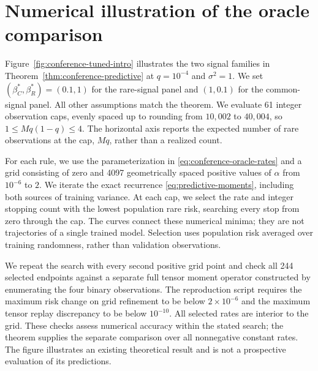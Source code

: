 \section{Numerical illustration of the oracle comparison}
\label{sec:predictive-intro-figure}

Figure~\ref{fig:conference-tuned-intro} illustrates the two signal families in
Theorem~\ref{thm:conference-predictive} at $q=10^{-4}$ and $\sigma^2=1$. We
set $(\beta_C^*,\beta_R^*)=(0.1,1)$ for the rare-signal panel and $(1,0.1)$ for
the common-signal panel. All other assumptions match the theorem. We evaluate
61 integer observation caps, evenly spaced up to rounding from $10{,}002$ to
$40{,}004$, so $1\leq Mq(1-q)\leq4$. The horizontal axis reports the expected
number of rare observations at the cap, $Mq$, rather than a realized count.

For each rule, we use the parameterization in
\eqref{eq:conference-oracle-rates} and a grid consisting of zero and 4097
geometrically spaced positive values of $\alpha$ from $10^{-6}$ to $2$. We
iterate the exact recurrence \eqref{eq:predictive-moments}, including both
sources of training variance. At each cap, we select the rate and integer
stopping count with the lowest population rare risk, searching every stop from
zero through the cap. The curves connect these numerical minima; they are not
trajectories of a single trained model. Selection uses population risk averaged
over training randomness, rather than validation observations.

We repeat the search with every second positive grid point and check all 244
selected endpoints against a separate full tensor moment operator constructed
by enumerating the four binary observations. The reproduction script requires
the maximum risk change on grid refinement to be below $2\times10^{-6}$ and the
maximum tensor replay discrepancy to be below $10^{-10}$. All selected rates
are interior to the grid. These checks assess numerical accuracy within the
stated search; the theorem supplies the separate comparison over all
nonnegative constant rates. The figure illustrates an existing theoretical
result and is not a prospective evaluation of its predictions.
